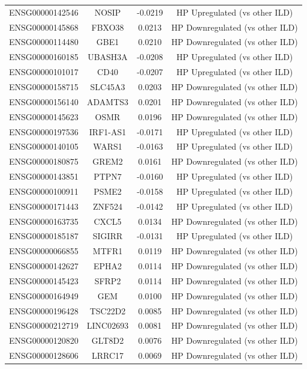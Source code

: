 \documentclass[
]{article}
\begin{document}
\begin{singlespace}
\begin{longtable}[t]{lccc}
ENSG00000142546 & NOSIP & -0.0219 & HP Upregulated (vs other ILD)\\
ENSG00000145868 & FBXO38 & 0.0213 & HP Downregulated (vs other ILD)\\
ENSG00000114480 & GBE1 & 0.0210 & HP Downregulated (vs other ILD)\\
ENSG00000160185 & UBASH3A & -0.0208 & HP Upregulated (vs other ILD)\\
\addlinespace
ENSG00000101017 & CD40 & -0.0207 & HP Upregulated (vs other ILD)\\
ENSG00000158715 & SLC45A3 & 0.0203 & HP Downregulated (vs other ILD)\\
ENSG00000156140 & ADAMTS3 & 0.0201 & HP Downregulated (vs other ILD)\\
ENSG00000145623 & OSMR & 0.0196 & HP Downregulated (vs other ILD)\\
ENSG00000197536 & IRF1-AS1 & -0.0171 & HP Upregulated (vs other ILD)\\
\addlinespace
ENSG00000140105 & WARS1 & -0.0163 & HP Upregulated (vs other ILD)\\
ENSG00000180875 & GREM2 & 0.0161 & HP Downregulated (vs other ILD)\\
ENSG00000143851 & PTPN7 & -0.0160 & HP Upregulated (vs other ILD)\\
ENSG00000100911 & PSME2 & -0.0158 & HP Upregulated (vs other ILD)\\
ENSG00000171443 & ZNF524 & -0.0142 & HP Upregulated (vs other ILD)\\
\addlinespace
ENSG00000163735 & CXCL5 & 0.0134 & HP Downregulated (vs other ILD)\\
ENSG00000185187 & SIGIRR & -0.0131 & HP Upregulated (vs other ILD)\\
ENSG00000066855 & MTFR1 & 0.0119 & HP Downregulated (vs other ILD)\\
ENSG00000142627 & EPHA2 & 0.0114 & HP Downregulated (vs other ILD)\\
ENSG00000145423 & SFRP2 & 0.0114 & HP Downregulated (vs other ILD)\\
\addlinespace
ENSG00000164949 & GEM & 0.0100 & HP Downregulated (vs other ILD)\\
ENSG00000196428 & TSC22D2 & 0.0085 & HP Downregulated (vs other ILD)\\
ENSG00000212719 & LINC02693 & 0.0081 & HP Downregulated (vs other ILD)\\
ENSG00000120820 & GLT8D2 & 0.0076 & HP Downregulated (vs other ILD)\\
ENSG00000128606 & LRRC17 & 0.0069 & HP Downregulated (vs other ILD)\\

\end{longtable}
\end{singlespace}
\end{document}
